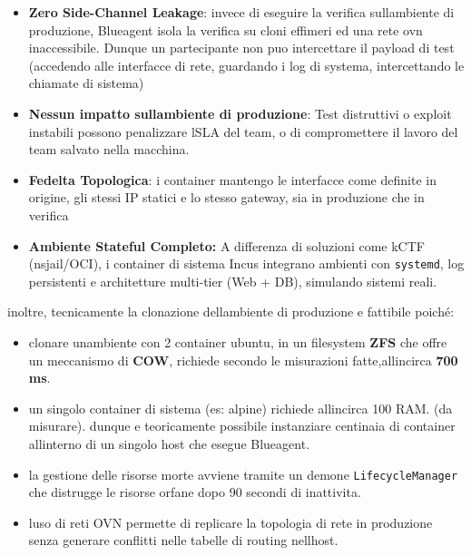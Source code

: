 \begin{itemize}
\tightlist
\item
  \textbf{Zero Side-Channel Leakage}: invece di eseguire la verifica
  sull\textquotesingle ambiente di produzione, Blueagent isola la
  verifica su cloni effimeri ed una rete ovn inaccessibile. Dunque un
  partecipante non puo\textquotesingle{} intercettare il payload di test
  (accedendo alle interfacce di rete, guardando i log di systema,
  intercettando le chiamate di sistema)
\item
  \textbf{Nessun impatto sull\textquotesingle ambiente di produzione}:
  Test distruttivi o exploit instabili possono penalizzare
  l\textquotesingle SLA del team, o di compromettere il lavoro del team
  salvato nella macchina.
\item
  \textbf{Fedelta Topologica}: i container mantengo le interfacce come
  definite in origine, gli stessi IP statici e lo stesso gateway, sia in
  produzione che in verifica
\item
  \textbf{Ambiente Stateful Completo:} A differenza di soluzioni come
  kCTF (nsjail/OCI), i container di sistema Incus integrano ambienti con
  \passthrough{\lstinline!systemd!}, log persistenti e architetture
  multi-tier (Web + DB), simulando sistemi reali.
\end{itemize}

inoltre, tecnicamente la clonazione dell\textquotesingle ambiente di
produzione e\textquotesingle{} fattibile poiché:

\begin{itemize}
\tightlist
\item
  clonare un\textquotesingle ambiente con 2 container ubuntu, in un
  filesystem \textbf{ZFS} che offre un meccanismo di \textbf{COW},
  richiede secondo le misurazioni fatte,all\textquotesingle incirca
  \textbf{700 ms}.
\item
  un singolo container di sistema (es: alpine) richiede
  all\textquotesingle incirca 100 RAM. (da misurare). dunque
  e\textquotesingle{} teoricamente possibile instanziare centinaia di
  container all\textquotesingle interno di un singolo host che esegue
  Blueagent.
\item
  la gestione delle risorse morte avviene tramite un demone
  \passthrough{\lstinline!LifecycleManager!} che distrugge le risorse
  orfane dopo 90 secondi di inattivita.
\item
  l\textquotesingle uso di reti OVN permette di replicare la topologia
  di rete in produzione senza generare conflitti nelle tabelle di
  routing nell\textquotesingle host.
\end{itemize}

